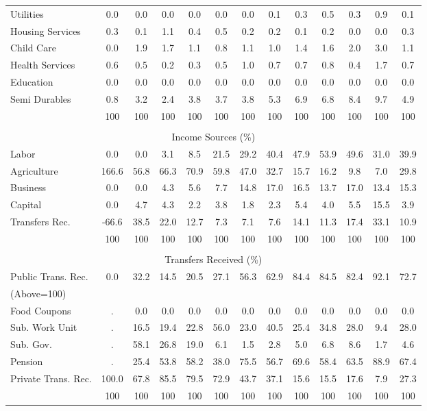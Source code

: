 \begin{tabular}{l c c c| c c c c c| c c c| c}
Utilities    & 0.0 & 0.0 & 0.0 & 0.0 & 0.0 & 0.0 & 0.1 & 0.3 & 0.5 & 0.3 & 0.9 & 0.1 \\
Housing Services  & 0.3 & 0.1 & 1.1 & 0.4 & 0.5 & 0.2 & 0.2 & 0.1 & 0.2 & 0.0 & 0.0 & 0.3 \\
Child Care   & 0.0 & 1.9 & 1.7 & 1.1 & 0.8 & 1.1 & 1.0 & 1.4 & 1.6 & 2.0 & 3.0 & 1.1 \\
Health Services    & 0.6 & 0.5 & 0.2 & 0.3 & 0.5 & 1.0 & 0.7 & 0.7 & 0.8 & 0.4 & 1.7 & 0.7 \\
Education   & 0.0 & 0.0 & 0.0 & 0.0 & 0.0 & 0.0 & 0.0 & 0.0 & 0.0 & 0.0 & 0.0 & 0.0 \\
Semi Durables     & 0.8 & 3.2 & 2.4 & 3.8 & 3.7 & 3.8 & 5.3 & 6.9 & 6.8 & 8.4 & 9.7 & 4.9 \\
\midrule
 & 100 & 100 & 100 & 100 & 100 & 100 & 100 & 100 & 100 & 100 & 100 & 100 \\
\midrule \\
\multicolumn{13}{c}{Income Sources (\%)}  \\
\midrule
Labor        & 0.0 & 0.0 & 3.1 & 8.5 & 21.5 & 29.2 & 40.4 & 47.9 & 53.9 & 49.6 & 31.0 & 39.9 \\
Agriculture  & 166.6 & 56.8 & 66.3 & 70.9 & 59.8 & 47.0 & 32.7 & 15.7 & 16.2 & 9.8 & 7.0 & 29.8 \\
Business     & 0.0 & 0.0 & 4.3 & 5.6 & 7.7 & 14.8 & 17.0 & 16.5 & 13.7 & 17.0 & 13.4 & 15.3 \\
Capital      & 0.0 & 4.7 & 4.3 & 2.2 & 3.8 & 1.8 & 2.3 & 5.4 & 4.0 & 5.5 & 15.5 & 3.9 \\
Transfers Rec.  & -66.6 & 38.5 & 22.0 & 12.7 & 7.3 & 7.1 & 7.6 & 14.1 & 11.3 & 17.4 & 33.1 & 10.9 \\
\midrule
 & 100 & 100 & 100 & 100 & 100 & 100 & 100 & 100 & 100 & 100 & 100 & 100 \\
\midrule \\
\multicolumn{13}{c}{Transfers Received (\%)}  \\
\midrule
Public Trans. Rec.  & 0.0 & 32.2 & 14.5 & 20.5 & 27.1 & 56.3 & 62.9 & 84.4 & 84.5 & 82.4 & 92.1 & 72.7 \\
(Above=100) & & & & & & & & & & & &  \\
\hspace{.3cm} Food Coupons    & . & 0.0 & 0.0 & 0.0 & 0.0 & 0.0 & 0.0 & 0.0 & 0.0 & 0.0 & 0.0 & 0.0 \\
\hspace{.3cm} Sub. Work Unit  & . & 16.5 & 19.4 & 22.8 & 56.0 & 23.0 & 40.5 & 25.4 & 34.8 & 28.0 & 9.4 & 28.0 \\
\hspace{.3cm} Sub. Gov.       & . & 58.1 & 26.8 & 19.0 & 6.1 & 1.5 & 2.8 & 5.0 & 6.8 & 8.6 & 1.7 & 4.6 \\
\hspace{.3cm} Pension         & . & 25.4 & 53.8 & 58.2 & 38.0 & 75.5 & 56.7 & 69.6 & 58.4 & 63.5 & 88.9 & 67.4 \\
Private Trans. Rec. & 100.0 & 67.8 & 85.5 & 79.5 & 72.9 & 43.7 & 37.1 & 15.6 & 15.5 & 17.6 & 7.9 & 27.3 \\
\midrule
 & 100 & 100 & 100 & 100 & 100 & 100 & 100 & 100 & 100 & 100 & 100 & 100 \\
\bottomrule
\end{tabular}